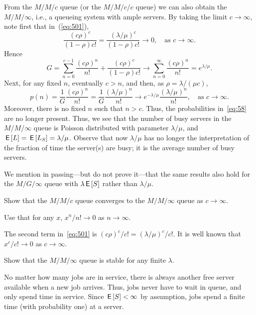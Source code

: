 From the $M/M/c$ queue (or the $M/M/c/c$ queue) we can also obtain the
$M/M/\infty$, i.e., a queueing system with ample servers. By taking
the limit $c\to\infty$, note first that in~(\ref{eq:501}),
\begin{equation*}
\frac{(c\rho)^c}{(1-\rho)c!} = \frac{(\lambda/\mu)^c}{(1-\rho)c!}\to 0, \quad\text{as } c\to \infty.
\end{equation*}
Hence
\begin{equation*}
G =\sum_{n=0}^{c-1} \frac{(c\rho)^n}{n!} + \frac{(c\rho)^c}{(1-\rho)c!} \to \sum_{n=0}^{\infty} \frac{(c\rho)^n}{n!} = e^{\lambda/\mu}.
\end{equation*}
Next, for any fixed $n$, eventually $c>n$, and then, as $\rho=\lambda/(\mu c)$, 
\begin{equation*}
  p(n) = \frac{1}G \frac{(c\rho)^n}{n!} = \frac{1}G \frac{(\lambda/\mu)^n}{n!} 
\to e^{-\lambda/\mu}  \frac{(\lambda/\mu)^n}{n!}, \quad\text{as } c\to\infty.
\end{equation*}
Moreover, there is no fixed $n$ such that $n>c$. Thus, the probabilities in~\eqref{eq:58} are no longer present. Thus, we see that the number of busy servers in the $M/M/\infty$ queue is
Poisson distributed with parameter $\lambda/\mu$, and
$\,\mathsf{E}\left[L\right] = \,\mathsf{E}\left[L_S\right] = \lambda/\mu$.  Observe that now $\lambda/\mu$ has
no longer the interpretation of the fraction of time the server(s) are
busy; it is the average number of busy servers.

We mention in passing---but do not
prove it---that the same results also hold for the $M/G/\infty$ queue
with $\lambda \,\mathsf{E}\left[S\right]$ rather than $\lambda/\mu$.


\begin{exercise}[\faFlask]
 Show that the $M/M/c$ queue converges to the $M/M/\infty$ queue as $c\to\infty$. 
  \begin{hint}
Use that for any $x$, $x^n/n!\to 0$ as $n\to\infty$.
  \end{hint}
 \begin{solution}
   The second term in~\eqref{eq:501} is $(c\rho)^c/c! = (\lambda/\mu)^c/c!$. It is well
   known that $x^c/c!\to 0$ as $c\to \infty$.
\end{solution}
\end{exercise}


\begin{exercise}[\faFlask]
 Show that the $M/M/\infty$ queue is stable for any finite $\lambda$. 
 \begin{solution}
    No matter how many jobs are in service, there is always another
   free server available when a new job arrives. Thus, jobs never have
   to wait in queue, and only spend time in service. Since
   $\,\mathsf{E}\left[S\right] < \infty$ by assumption, jobs spend a finite time (with
   probability one) at a server.
\end{solution}
\end{exercise}

